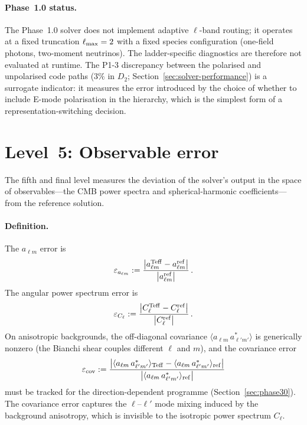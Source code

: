 \paragraph{Phase~1.0 status.}

The Phase~1.0 solver does not implement adaptive $\ell$-band
routing; it operates at a fixed truncation
$\ell_{\rm max} = 2$ with a fixed species configuration
(one-field photons, two-moment neutrinos).  The
ladder-specific diagnostics are therefore not evaluated at
runtime.  The P1-3 discrepancy between the polarised and
unpolarised code paths ($3\%$ in $D_2$;
Section~\ref{sec:solver-performance}) is a surrogate
indicator: it measures the error introduced by the choice
of whether to include E-mode polarisation in the hierarchy,
which is the simplest form of a representation-switching
decision.


\section{Level~5: Observable error}
\label{sec:err-observable}

The fifth and final level measures the deviation of the
solver's output in the space of observables---the CMB power
spectra and spherical-harmonic coefficients---from the
reference solution.


\paragraph{Definition.}

The $a_{\ell m}$ error is
\begin{equation}\label{eq:err-alm}
\varepsilon_{a_{\ell m}}
:= \frac{
  \big|
    a_{\ell m}^{\rm Teff}
    - a_{\ell m}^{\rm ref}
  \big|
}{
  \big| a_{\ell m}^{\rm ref} \big|
}\,.
\end{equation}
The angular power spectrum error is
\begin{equation}\label{eq:err-Cl}
\varepsilon_{C_\ell}
:= \frac{
  \big|
    C_\ell^{\rm Teff}
    - C_\ell^{\rm ref}
  \big|
}{
  \big| C_\ell^{\rm ref} \big|
}\,.
\end{equation}
On anisotropic backgrounds, the off-diagonal covariance
$\langle a_{\ell m}\,a_{\ell' m'}^* \rangle$ is generically
nonzero (the Bianchi shear couples different $\ell$ and $m$),
and the covariance error
\begin{equation}\label{eq:err-cov}
\varepsilon_{\rm cov}
:= \frac{
  \big|
    \langle a_{\ell m}\,a_{\ell' m'}^* \rangle_{\rm Teff}
    - \langle a_{\ell m}\,a_{\ell' m'}^* \rangle_{\rm ref}
  \big|
}{
  \big|
    \langle a_{\ell m}\,a_{\ell' m'}^* \rangle_{\rm ref}
  \big|
}
\end{equation}
must be tracked for the direction-dependent programme
(Section~\ref{sec:phase30}).  The covariance error
captures the $\ell$--$\ell'$ mode mixing induced by
the background anisotropy, which is invisible to the
isotropic power spectrum $C_\ell$.


